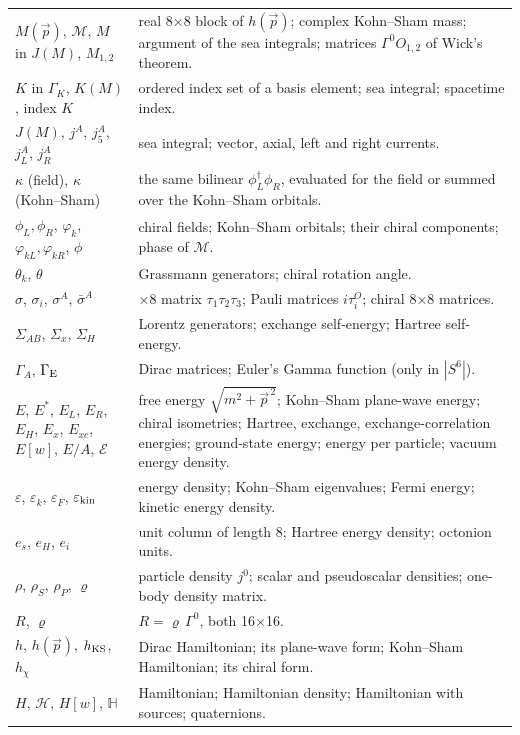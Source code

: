 \documentclass[10pt,a4paper]{article}
\begin{document}
{\begin{longtable}{>{\raggedright\arraybackslash}p{}>{\raggedright\arraybackslash}p{}}
$M(\vec p)$, $\mathcal M$, $M$ in $J(M)$, $M_{1,2}$ & real 8×8 block of $h(\vec p)$; complex Kohn–Sham mass; argument of the sea integrals; matrices $\Gamma^0O_{1,2}$ of Wick’s theorem. \\
$K$ in $\Gamma_K$, $K(M)$, index $K$ & ordered index set of a basis element; sea integral; spacetime index. \\
$J(M)$, $j^A$, $j_5^A$, $j_L^A$, $j_R^A$ & sea integral; vector, axial, left and right currents. \\
$\kappa$ (field), $\kappa$ (Kohn–Sham) & the same bilinear $\phi_L^\dagger\phi_R$, evaluated for the field or summed over the Kohn–Sham orbitals. \\
$\phi_L,\phi_R$, $\varphi_k$, $\varphi_{kL},\varphi_{kR}$, $\phi$ & chiral fields; Kohn–Sham orbitals; their chiral components; phase of $\mathcal M$. \\
$\theta_k$, $\theta$ & Grassmann generators; chiral rotation angle. \\
$\sigma$, $\sigma_i$, $\sigma^A$, $\bar\sigma^A$ & 8×8 matrix $\tau_1\tau_2\tau_3$; Pauli matrices $i\tau^{O}_i$; chiral 8×8 matrices. \\
$\Sigma_{AB}$, $\Sigma_x$, $\Sigma_H$ & Lorentz generators; exchange self-energy; Hartree self-energy. \\
$\Gamma_A$, $\Gamma_{\rm E}$ & Dirac matrices; Euler’s Gamma function (only in $|S^6|$). \\
$E$, $E^*$, $E_L$, $E_R$, $E_H$, $E_x$, $E_{xc}$, $E[w]$, $E/A$, $\mathcal E$ & free energy $\sqrt{m^2+\vec p^{\,2}}$; Kohn–Sham plane-wave energy; chiral isometries; Hartree, exchange, exchange-correlation energies; ground-state energy; energy per particle; vacuum energy density. \\
$\varepsilon$, $\varepsilon_k$, $\varepsilon_F$, $\varepsilon_{\rm kin}$ & energy density; Kohn–Sham eigenvalues; Fermi energy; kinetic energy density. \\
$e_s$, $e_H$, $e_i$ & unit column of length 8; Hartree energy density; octonion units. \\
$\rho$, $\rho_S$, $\rho_P$, $\varrho$ & particle density $j^0$; scalar and pseudoscalar densities; one-body density matrix. \\
$R$, $\varrho$ & $R=\varrho\,\Gamma^0$, both 16×16. \\
$h$, $h(\vec p)$, $h_{\rm KS}$, $h_\chi$ & Dirac Hamiltonian; its plane-wave form; Kohn–Sham Hamiltonian; its chiral form. \\
$H$, $\mathcal H$, $H[w]$, $\mathbb H$ & Hamiltonian; Hamiltonian density; Hamiltonian with sources; quaternions. \\

\end{longtable}}
\end{document}
